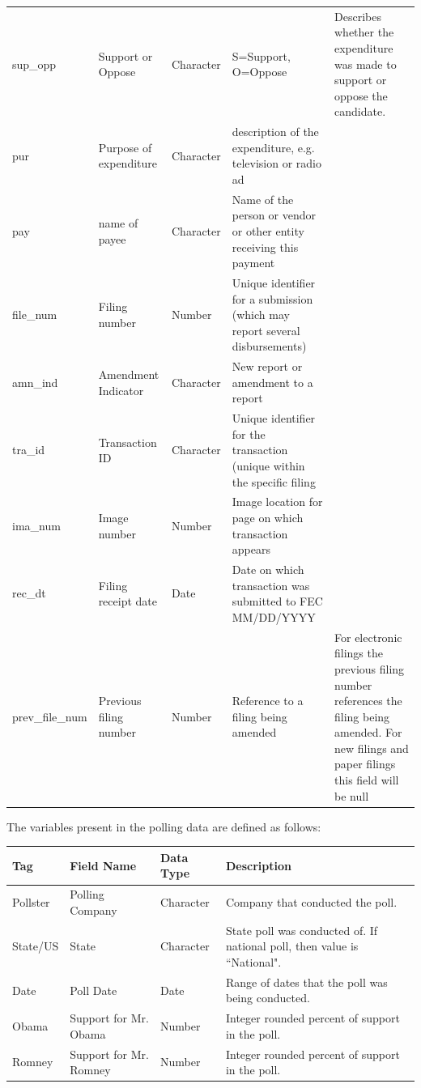 \documentclass[11pt]{article}\usepackage{graphicx, color}
\begin{document}
\begin{landscape}
\begin{center}
\begin{longtable}[\textwidth]{l l l p{0.4\textheight} p{0.4\textheight}}
sup\_opp &	Support or Oppose &	Character &	S=Support, O=Oppose	& Describes whether the expenditure was made to support or oppose the candidate. \\	 
pur &	Purpose of expenditure &	Character	&	description of the expenditure, e.g. television or radio ad & \\
pay &	name of payee	& Character &	Name of the person or vendor or other entity receiving this payment &\\
file\_num	& Filing number &	Number &	Unique identifier for a submission (which may report several disbursements) & \\
amn\_ind &	Amendment Indicator &	Character &	New report or amendment to a report	& \\	 
tra\_id	& Transaction ID &	Character	& Unique identifier for the transaction (unique within the specific filing	& \\
ima\_num &	Image number &	Number &	Image location for page on which transaction appears & \\
rec\_dt	& Filing receipt date	& Date & Date on which transaction was submitted to FEC	MM/DD/YYYY &\\	 
prev\_file_num & Previous filing number &	Number &	Reference to a filing being amended &	For electronic filings the previous filing number references the filing being amended. For new filings and paper filings this field will be null
\end{longtable}
\end{center}
\end{landscape}
\noindent
The variables present in the polling data are defined as follows:
\begin{center}
\begin{longtable}[\textwidth]{l p{} l p{}}
Tag & Field Name  & Data Type	& Description\\
\hline
Pollster & Polling Company & Character & Company that conducted the poll. \\
State/US & State & Character & State poll was conducted of. If national poll, then value is ``National".\\
Date & Poll Date & Date & Range of dates that the poll was being conducted.\\
Obama & Support for Mr. Obama & Number & Integer rounded percent of support in the poll. \\
Romney & Support for Mr. Romney & Number & Integer rounded percent of support in the poll.
\end{longtable}
\end{center}
\end{document}
